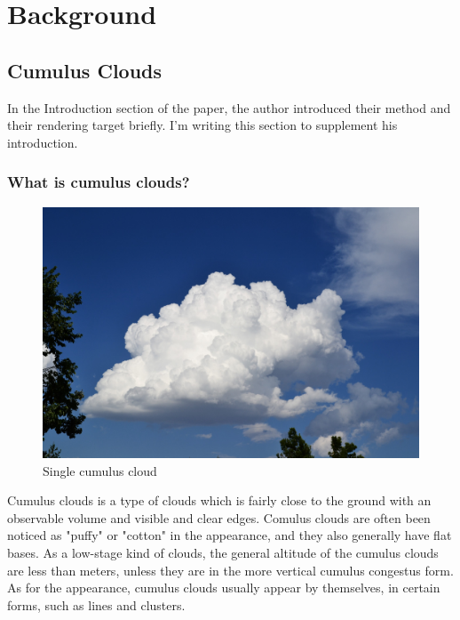 \chapter{Background}

\section{Cumulus Clouds}
In the Introduction section of the paper, the author introduced their method and their rendering target briefly. I'm writing this section to supplement his introduction.

\subsection{What is cumulus clouds?}

\begin{figure}[htp]
\begin{center}
\includegraphics[scale=0.1]{images/single-fluffy-cumulus-cloud-sunny-day-2012-07-26.jpg}
\caption{Single cumulus cloud}
\label{f1}
\end{center}
\end{figure}

Cumulus clouds is a type of clouds which is fairly close to the ground with an observable volume and visible and clear edges. Comulus clouds are often been noticed as "puffy" or "cotton" in the appearance, and they also generally have flat bases. As a low-stage kind of clouds, the general altitude of the cumulus clouds are less than meters, unless they are in the more vertical cumulus congestus form. As for the appearance, cumulus clouds usually appear by themselves, in certain forms, such as lines and clusters.

